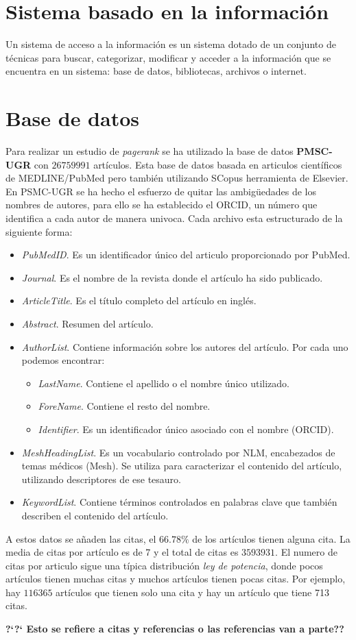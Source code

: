 \documentclass[size=a4, parskip=half, titlepage=false, toc=flat, toc=bib, 12pt]{scrartcl}
\theoremstyle{theorem-style}
\theoremstyle{definition-style}
\theoremstyle{remark-style}
\theoremstyle{example-style}
\theoremstyle{definition-style}
\theoremstyle{remark-style}
\begin{document}
\section{Sistema basado en la información}
Un sistema de acceso a la información es un sistema dotado de un conjunto de técnicas para buscar, categorizar, modificar y acceder a la información que se encuentra en un sistema: base de datos, bibliotecas, archivos o internet.

\section{Base de datos}

Para realizar un estudio de \textit{pagerank} se ha utilizado la base de datos \textbf{PMSC-UGR} con
$26759991$ artículos. Esta base de datos basada en articulos científicos de MEDLINE/PubMed  pero
también utilizando SCopus herramienta de Elsevier. En PSMC-UGR se ha hecho el esfuerzo de
quitar las ambigüedades de los nombres de autores, para ello se ha establecido el ORCID, un número
que identifica a cada autor de manera univoca. Cada archivo esta estructurado de la siguiente forma:
\begin{itemize}
\item \textit{PubMedID}. Es un identificador único del articulo proporcionado por PubMed.
\item \textit{Journal}. Es el nombre de la revista donde el artículo ha sido publicado.
\item \textit{ArticleTitle}. Es el título completo del artículo en inglés.
\item \textit{Abstract}. Resumen del artículo.
\item \textit{AuthorList}. Contiene información sobre los autores del artículo. Por cada uno podemos encontrar:
\begin{itemize}
\item \textit{LastName}. Contiene el apellido o el nombre único utilizado.
\item \textit{ForeName}. Contiene el resto del nombre.
\item \textit{Identifier}. Es un identificador único asociado con el nombre (ORCID).
\end{itemize}
\item \textit{MeshHeadingList}. Es un vocabulario controlado por NLM, encabezados de temas médicos (Mesh). Se utiliza para caracterizar el contenido del artículo, utilizando descriptores de ese tesauro.
\item \textit{KeywordList}. Contiene términos controlados en palabras clave que también describen el contenido del artículo.
\end{itemize}

A estos datos se añaden las citas, el $66.78 \%$ de los artículos tienen alguna cita. La media de citas por artículo es de 7 y el total de citas es $3593931$. El numero de citas por articulo sigue una típica distribución \textit{ley de potencia}, donde pocos artículos tienen muchas citas y muchos artículos tienen pocas citas. Por ejemplo, hay $116365$ artículos que tienen solo una cita y hay un artículo que tiene 713 citas.

\textbf{?`?` Esto se refiere a citas y referencias o las referencias van a parte??}
\end{document}
